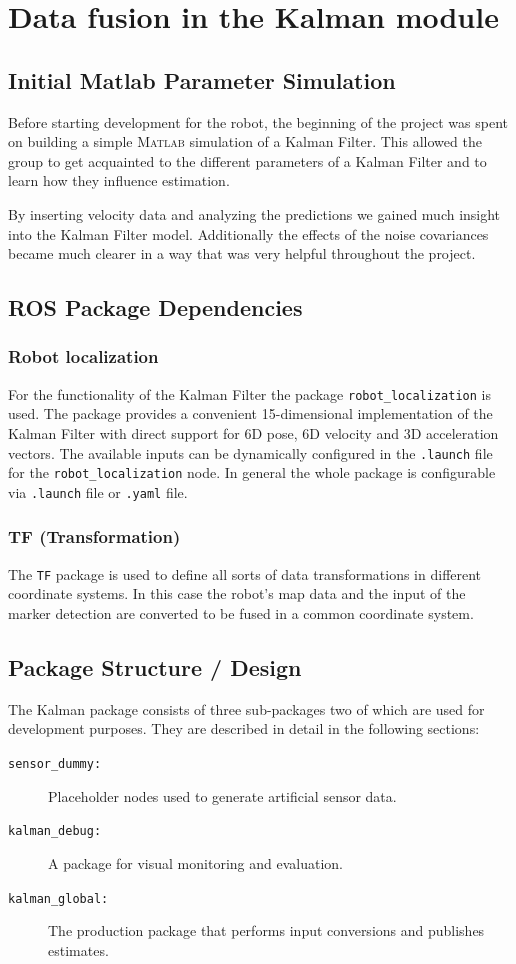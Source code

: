 \chapter{Data fusion in the Kalman module}
\section{Initial Matlab Parameter Simulation}
Before starting development for the robot, the beginning of the project was spent on building a simple \textsc{Matlab} simulation of a Kalman Filter.
This allowed the group to get acquainted to the different parameters of a Kalman Filter and to learn how they influence estimation.

By inserting velocity data and analyzing the predictions we gained much insight into the Kalman Filter model. Additionally the effects of the noise covariances became much clearer in a way that was very helpful throughout the project.

\section{ROS Package Dependencies}
\subsection{Robot localization}
For the functionality of the Kalman Filter the package \texttt{robot\_localization} is used. The package provides a convenient 15-dimensional implementation of the Kalman Filter with direct support for 6D pose, 6D velocity and 3D acceleration vectors. The available inputs can be dynamically configured in the \texttt{.launch} file for the \texttt{robot\_localization} node. In general the whole package is configurable via \texttt{.launch} file or \texttt{.yaml} file.

\subsection{TF (Transformation)}
The \texttt{TF} package is used to define all sorts of data transformations in different coordinate systems. In this case the robot's map data and the input of the marker detection are converted to be fused in a common coordinate system. 

\section{Package Structure / Design}
The Kalman package consists of three sub-packages two of which are used for development purposes. They are described in detail in the following sections:
\begin{description}
\item[\texttt{sensor\_dummy:}] Placeholder nodes used to generate artificial sensor data.
\item[\texttt{kalman\_debug:}] A package for visual monitoring and evaluation.
\item[\texttt{kalman\_global:}] The production package that performs input conversions and publishes estimates.
\end{description}

